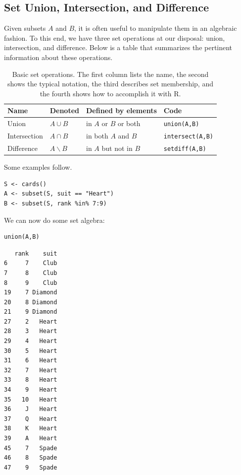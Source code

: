 \documentclass[captions=tableheading]{scrbook}
\begin{document}
\subsection{Set Union, Intersection, and Difference}
\label{sec-4-2-3}


Given subsets \(A\) and \(B\), it is often useful to manipulate them in an algebraic fashion. To this end, we have three set operations at our disposal: union, intersection, and difference. Below is a table that summarizes the pertinent information about these operations.

\begin{table}[htb]
\caption[Set operations]{Basic set operations.  The first column lists the name, the second shows the typical notation, the third describes set membership, and the fourth shows how to accomplish it with R.} \label{exa-sample-urn-two-from-three}
\begin{center}
\begin{tabular}{llll}
\hline
 Name          &  Denoted            &  Defined by elements        &  Code                     \\
\hline
 Union         &  \(A\cup B\)        &  in \(A\) or \(B\) or both  &  \texttt{union(A,B)}      \\
 Intersection  &  \(A\cap B\)        &  in both \(A\) and \(B\)    &  \texttt{intersect(A,B)}  \\
 Difference    &  \(A\backslash B\)  &  in \(A\) but not in \(B\)  &  \texttt{setdiff(A,B)}    \\
\hline
\end{tabular}
\end{center}
\end{table}



Some examples follow. 


\begin{verbatim}
S <- cards() 
A <- subset(S, suit == "Heart") 
B <- subset(S, rank %in% 7:9)
\end{verbatim}

We can now do some set algebra: 


\begin{verbatim}
union(A,B)
\end{verbatim}


\begin{verbatim}
   rank    suit
6     7    Club
7     8    Club
8     9    Club
19    7 Diamond
20    8 Diamond
21    9 Diamond
27    2   Heart
28    3   Heart
29    4   Heart
30    5   Heart
31    6   Heart
32    7   Heart
33    8   Heart
34    9   Heart
35   10   Heart
36    J   Heart
37    Q   Heart
38    K   Heart
39    A   Heart
45    7   Spade
46    8   Spade
47    9   Spade
\end{verbatim}
\end{document}
